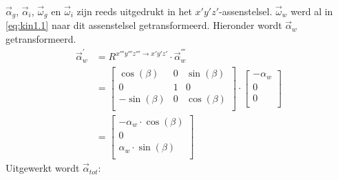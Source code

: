 $\vec{\alpha}_{g}$, $\vec{\alpha}_{i}$, $\vec{\omega}_{g}$ en $\vec{\omega}_{i}$ zijn reeds uitgedrukt in het $x'y'z'$-assenstelsel. $\vec{\omega}_{w}$ werd al in \eqref{eq:kin1.1} naar dit assenstelsel getransformeerd. Hieronder wordt $\vec{\alpha}_{w}$ getransformeerd.
\begin{equation}
\begin{split}
\vec{\alpha}_{w}^{'}&=R^{x'''y'''z''' \rightarrow x'y'z'} \cdot \vec{\alpha}_{w}^{'''}\\
&=\begin{bmatrix}
\cos(\beta)	&			0			&\sin(\beta)\\
0						&			1			&			0		 \\
-\sin(\beta)&			0			&\cos(\beta)\\
\end{bmatrix}
\cdot
\begin{bmatrix}
-\alpha_{w}	\\
0						\\
0						\\
\end{bmatrix}\\
&=
\begin{bmatrix}
-\alpha_{w}\cdot \cos(\beta)	\\
0						\\
\alpha_{w}\cdot \sin(\beta)	\\
\end{bmatrix}
\end{split}
\label{eq:kin2.4}
\end{equation}
Uitgewerkt wordt $\vec{\alpha}_{tot}$:
